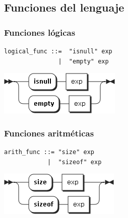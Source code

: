 \subsection{Funciones del lenguaje}
\subsubsection{Funciones lógicas}
\begin{multicols}{2}
\begin{lstlisting}[style=nonumbers]      
logical_func ::=  "isnull" exp
               |  "empty" exp
\end{lstlisting}  
\columnbreak	
\begin{center}
\includegraphics[scale=0.5]{diagram/logical_func.png} \\
\end{center}
\end{multicols}

\subsubsection{Funciones aritméticas}
\begin{multicols}{2}
\begin{lstlisting}[style=nonumbers]      
arith_func ::= "size" exp
            |  "sizeof" exp
\end{lstlisting}  
\columnbreak	
\begin{center}
\includegraphics[scale=0.5]{diagram/arith_func.png} \\
\end{center}
\end{multicols}

